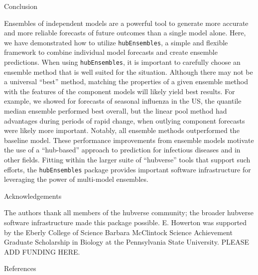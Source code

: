 \documentclass[
  article,
  shortnames,
  notitle]{jss}
\begin{document}
Conclusion

Ensembles of independent models are a powerful tool to generate more
accurate and more reliable forecasts of future outcomes than a single
model alone. Here, we have demonstrated how to utilize
\texttt{hubEnsembles}, a simple and flexible framework to combine
individual model forecasts and create ensemble predictions. When using
\texttt{hubEnsembles}, it is important to carefully choose an ensemble
method that is well suited for the situation. Although there may not be
a universal ``best'' method, matching the properties of a given ensemble
method with the features of the component models will likely yield best
results. For example, we showed for forecasts of seasonal influenza in
the US, the quantile median ensemble performed best overall, but the
linear pool method had advantages during periods of rapid change, when
outlying component forecasts were likely more important. Notably, all
ensemble methods outperformed the baseline model. These performance
improvements from ensemble models motivate the use of a ``hub-based''
approach to prediction for infectious diseases and in other fields.
Fitting within the larger suite of ``hubverse'' tools that support such
efforts, the \texttt{hubEnsembles} package provides important software
infrastructure for leveraging the power of multi-model ensembles.

Acknowledgements

The authors thank all members of the hubverse community; the broader
hubverse software infrastructure made this package possible. E. Howerton
was supported by the Eberly College of Science Barbara McClintock
Science Achievement Graduate Scholarship in Biology at the Pennsylvania
State University. PLEASE ADD FUNDING HERE.

References


  
\end{document}
